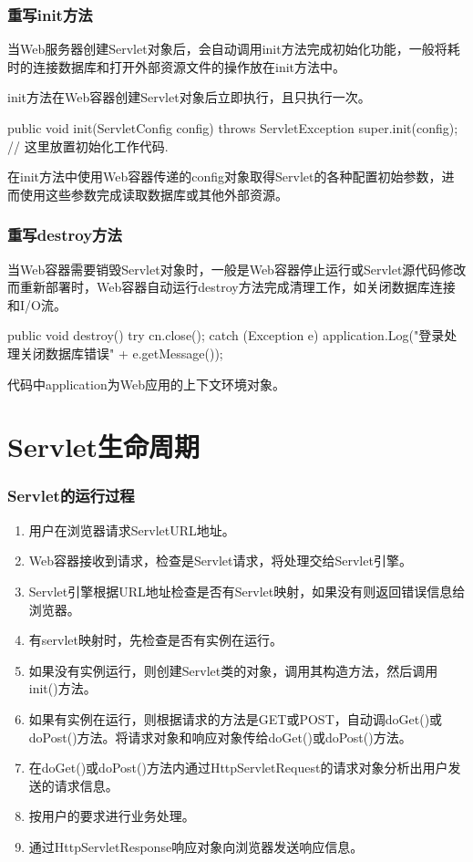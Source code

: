 \begin{frame}[fragile] %
\frametitle{重写init方法} 

当Web服务器创建Servlet对象后，会自动调用init方法完成初始化功能，一般将耗时的连接数据库和打开外部资源文件的操作放在init方法中。

init方法在Web容器创建Servlet对象后立即执行，且只执行一次。

\begin{javaCode}
public void init(ServletConfig config) throws ServletException {
  super.init(config);
  // 这里放置初始化工作代码.
}
\end{javaCode}

\kai 在init方法中使用Web容器传递的config对象取得Servlet的各种配置初始参数，进而使用这些参数完成读取数据库或其他外部资源。
\end{frame}

\begin{frame}[fragile] %
\frametitle{重写destroy方法} 

当Web容器需要销毁Servlet对象时，一般是Web容器停止运行或Servlet源代码修改而重新部署时，Web容器自动运行destroy方法完成清理工作，如关闭数据库连接和I/O流。

\begin{javaCode}
public  void destroy() {
  try {
    cn.close();
  } catch (Exception e) {
    application.Log("登录处理关闭数据库错误" + e.getMessage());
  }
}
\end{javaCode}

\kai 代码中application为Web应用的上下文环境对象。
\end{frame}

\section{Servlet生命周期}

\begin{frame}[fragile] %
  \frametitle{Servlet的运行过程} 
  \begin{enumerate}[<+-|alert@+>]\kai
  \item 用户在浏览器请求ServletURL地址。
  \item Web容器接收到请求，检查是Servlet请求，将处理交给Servlet引擎。
  \item Servlet引擎根据URL地址检查是否有Servlet映射，如果没有则返回错误信息给浏览器。
  \item 有servlet映射时，先检查是否有实例在运行。
  \item 如果没有实例运行，则创建Servlet类的对象，调用其构造方法，然后调用init()方法。
  \item 如果有实例在运行，则根据请求的方法是GET或POST，自动调doGet()或doPost()方法。将请求对象和响应对象传给doGet()或doPost()方法。
  \item 在doGet()或doPost()方法内通过HttpServletRequest的请求对象分析出用户发送的请求信息。
  \item 按用户的要求进行业务处理。
  \item 通过HttpServletResponse响应对象向浏览器发送响应信息。
  \end{enumerate}
\end{frame}

